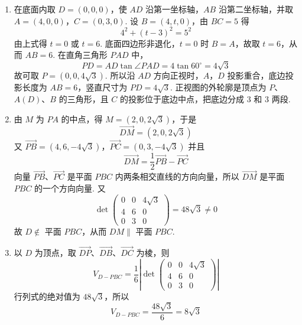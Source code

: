 \begin{solution}
\begin{enumerate}
\item 在底面内取 \(D=(0,0,0)\)，使 \(AD\) 沿第一坐标轴，\(AB\) 沿第二坐标轴，并取 \(A=(4,0,0)\)，\(C=(0,3,0)\). 设 \(B=(4,t,0)\)，由 \(BC=5\) 得
\[
4^2+(t-3)^2=5^2
\]
由上式得 \(t=0\) 或 \(t=6\). 底面四边形非退化，\(t=0\) 时 \(B=A\)，故取 \(t=6\)，从而 \(AB=6\). 在直角三角形 \(PAD\) 中，
\[
PD=AD\tan\angle PAD=4\tan60^\circ=4\sqrt3
\]
故可取 \(P=(0,0,4\sqrt3)\).
所以沿 \(AD\) 方向正视时，\(A\)，\(D\) 投影重合，底边投影长度为 \(AB=6\)，竖直尺寸为 \(PD=4\sqrt3\). 正视图的外轮廓是顶点为 \(P\)、\(A(D)\)、\(B\) 的三角形，且 \(C\) 的投影位于底边中点，把底边分成 \(3\) 和 \(3\) 两段.

\item 由 \(M\) 为 \(PA\) 的中点，得 \(M=(2,0,2\sqrt3)\)，于是
\[
\overrightarrow{DM}=(2,0,2\sqrt3)
\]
又
\(\overrightarrow{PB}=(4,6,-4\sqrt3)\)，\(\overrightarrow{PC}=(0,3,-4\sqrt3)\)
并且
\[
\overrightarrow{DM}=\frac12\overrightarrow{PB}-\overrightarrow{PC}
\]
向量 \(\overrightarrow{PB}\)、\(\overrightarrow{PC}\) 是平面 \(PBC\) 内两条相交直线的方向向量，所以 \(\overrightarrow{DM}\) 是平面 \(PBC\) 的一个方向向量. 又
\[
\det\begin{pmatrix}
0&0&4\sqrt3\\
4&6&0\\
0&3&0
\end{pmatrix}=48\sqrt3\ne0
\]
故 \(D\notin\) 平面 \(PBC\)，从而 \(DM\parallel\) 平面 \(PBC\).

\item 以 \(D\) 为顶点，取 \(\overrightarrow{DP}\)、\(\overrightarrow{DB}\)、\(\overrightarrow{DC}\) 为棱，则
\[
V_{D-PBC}=\frac16\left|\det\begin{pmatrix}
0&0&4\sqrt3\\
4&6&0\\
0&3&0
\end{pmatrix}\right|
\]
行列式的绝对值为 \(48\sqrt3\)，所以
\[
V_{D-PBC}=\frac{48\sqrt3}{6}=8\sqrt3
\]
\end{enumerate}
\end{solution}

